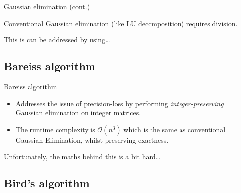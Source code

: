 \documentclass{beamer}
\begin{document}
\begin{frame}{Gaussian elimination (cont.)}

    Conventional Gaussian elimination (like LU decomposition) requires division.

    \pause{}

    This is can be addressed by using\dots

\end{frame}

\subsection{Bareiss algorithm}

\begin{frame}{Bareiss algorithm}

    \begin{itemize}

        \item Addresses the issue of precision-loss by performing \emph{integer-preserving}
            Gaussian elimination on integer matrices.

        \item The runtime complexity is $\mathcal{O}(n^3)$ which is the same as conventional
            Gaussian Elimination, whilst preserving exactness.

    \end{itemize}

    \pause{}

    Unfortunately, the maths behind this is a bit hard\dots

\end{frame}

\subsection{Bird's algorithm}
\end{document}
